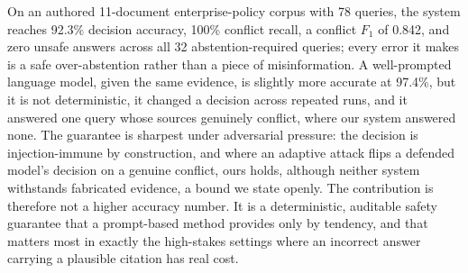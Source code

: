 \documentclass[conference]{IEEEtran}
\begin{document}
On an authored 11-document enterprise-policy corpus with 78 queries, the
system reaches 92.3\% decision accuracy, 100\% conflict recall, a conflict
$F_1$ of 0.842, and zero unsafe answers across all 32 abstention-required
queries; every error it makes is a safe over-abstention rather than a piece
of misinformation. A well-prompted language model, given the same evidence,
is slightly more accurate at 97.4\%, but it is not deterministic, it changed
a decision across repeated runs, and it answered one query whose sources
genuinely conflict, where our system answered none. The guarantee is
sharpest under adversarial pressure: the decision is injection-immune by
construction, and where an adaptive attack flips a defended model's decision
on a genuine conflict, ours holds, although neither system withstands
fabricated evidence, a bound we state openly. The contribution is therefore
not a higher accuracy number. It is a deterministic, auditable safety
guarantee that a prompt-based method provides only by tendency, and that
matters most in exactly the high-stakes settings where an incorrect answer
carrying a plausible citation has real cost.




\balance
\end{document}
